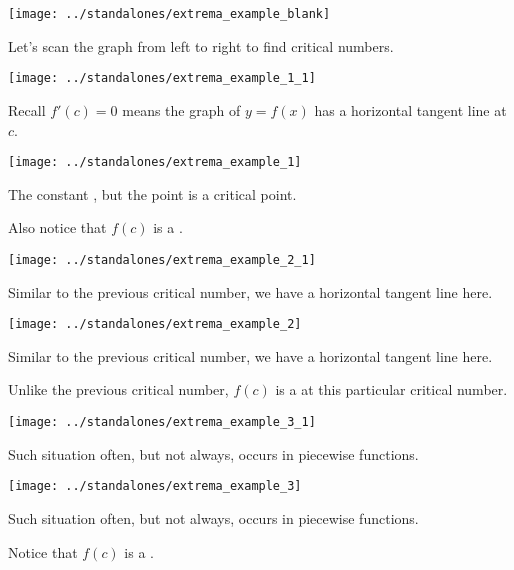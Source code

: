 \documentclass[12pt]{beamer}
\begin{document}
 
\begin{frame}[t]
  \texttt{[image: ../standalones/extrema\_example\_blank]}

  Let's scan the graph from left to right to find critical numbers.
\end{frame}

\begin{frame}[t]
  \texttt{[image: ../standalones/extrema\_example\_1\_1]}

  Recall \(f'(c) = 0\) means the graph of \(y = f(x)\) has a horizontal tangent line at \(c\).
\end{frame}

\begin{frame}[t]
  \texttt{[image: ../standalones/extrema\_example\_1]}
  
  \pause
  The constant , but the point  is a critical point.

  Also notice that \(f(c)\) is a .
\end{frame}

\begin{frame}[t]
  \texttt{[image: ../standalones/extrema\_example\_2\_1]}

  Similar to the previous critical number, we have a horizontal tangent line here.
\end{frame}

\begin{frame}[t]
  \texttt{[image: ../standalones/extrema\_example\_2]}
  
  Similar to the previous critical number, we have a horizontal tangent line here.
  \pause

  Unlike the previous critical number, \(f(c)\) is a  at this particular critical number.
\end{frame}


\begin{frame}[t]
  \texttt{[image: ../standalones/extrema\_example\_3\_1]}

  Such situation often, but not always, occurs in piecewise functions.
\end{frame}

\begin{frame}[t]
  \texttt{[image: ../standalones/extrema\_example\_3]}
  
  Such situation often, but not always, occurs in piecewise functions.

  \pause 
  Notice that \(f(c)\) is a .
\end{frame}
\end{document}
